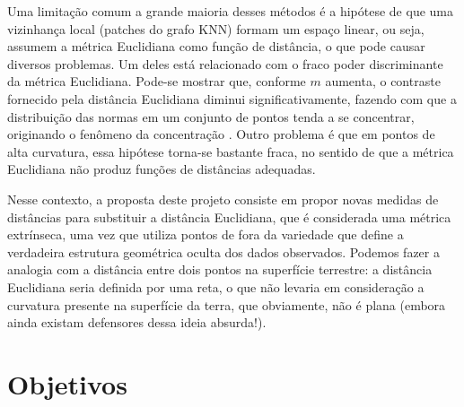 \documentclass[a4paper,12pt]{article}
\begin{document}
Uma limitação comum a grande maioria desses métodos é a hipótese de que uma vizinhança local (patches do grafo KNN) formam um espaço linear, ou seja, assumem a métrica Euclidiana como função de distância, o que pode causar diversos problemas. Um deles está relacionado com o fraco poder discriminante da métrica Euclidiana. Pode-se mostrar que, conforme $m$ aumenta, o contraste fornecido pela distância Euclidiana diminui significativamente, fazendo com que a distribuição das normas em um conjunto de pontos tenda a se concentrar, originando o fenômeno da concentração \cite{Verleysen}. Outro problema é que em pontos de alta curvatura, essa hipótese torna-se bastante fraca, no sentido de que a métrica Euclidiana não produz funções de distâncias adequadas. 

Nesse contexto, a proposta deste projeto consiste em propor novas medidas de distâncias para substituir a distância Euclidiana, que é considerada uma métrica extrínseca, uma vez que utiliza pontos de fora da variedade que define a verdadeira estrutura geométrica oculta dos dados observados. Podemos fazer a analogia com a distância entre dois pontos na superfície terrestre: a distância Euclidiana seria definida por uma reta, o que não levaria em consideração a curvatura presente na superfície da terra, que obviamente, não é plana (embora ainda existam defensores dessa ideia absurda!).

\section{Objetivos}
\label{sc:objetivos}

%
%
\end{document}
